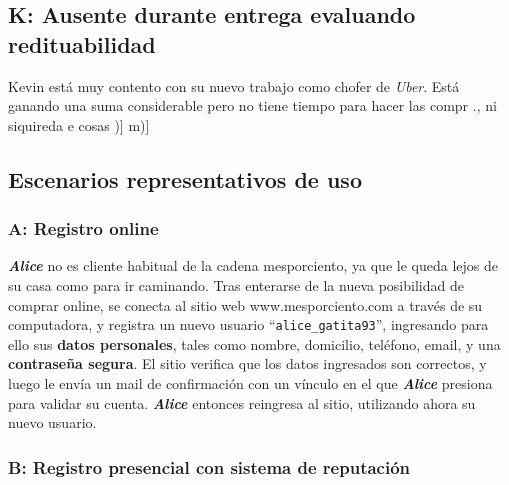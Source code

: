 \subsection{K: Ausente durante entrega evaluando redituabilidad}

Kevin está muy contento con su nuevo trabajo como chofer de \textit{Uber}. Está
ganando una suma considerable pero no tiene tiempo para hacer las compr
., ni
siquireda e cosas
)]
m)]
\newpage
\subsection{Escenarios representativos de uso}

\subsubsection{A: Registro online}

\textbf{\emph{Alice}} no es cliente habitual de la cadena mesporciento, ya que
le queda lejos de su casa como para ir caminando. Tras enterarse de la nueva
posibilidad de comprar online, se conecta al sitio web www.mesporciento.com a
través de su computadora, y registra un nuevo usuario
``\texttt{alice\_gatita93}'', ingresando para ello sus \textbf{datos
personales}, tales como nombre, domicilio, teléfono, email, y una
\textbf{contraseña segura}. El sitio verifica que los datos ingresados son
correctos, y luego le envía un mail de confirmación con un vínculo en el que
\textbf{\emph{Alice}} presiona para validar su cuenta. \textbf{\emph{Alice}}
entonces reingresa al sitio, utilizando ahora su nuevo usuario.

\subsubsection{B: Registro presencial con sistema de reputación}

